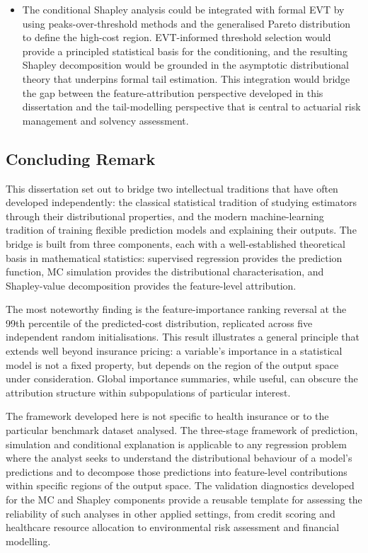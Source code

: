 \begin{itemize}
    \item The conditional Shapley analysis could be integrated with
          formal EVT by using peaks-over-threshold
          methods and the generalised Pareto distribution to define the
          high-cost region.  EVT-informed threshold selection would
          provide a principled statistical basis for the conditioning,
          and the resulting Shapley decomposition would be grounded in
          the asymptotic distributional theory that underpins formal tail
          estimation.  This integration would bridge the gap between
          the feature-attribution perspective developed in this
          dissertation and the tail-modelling perspective that is central
          to actuarial risk management and solvency assessment.
\end{itemize}


\subsection{Concluding Remark}
\label{sec:concluding_remark}

This dissertation set out to bridge two intellectual traditions that have
often developed independently: the classical statistical tradition of
studying estimators through their distributional properties, and the
modern machine-learning tradition of training flexible prediction models
and explaining their outputs.  The bridge is built from three components,
each with a well-established theoretical basis in mathematical statistics:
supervised regression provides the prediction function, MC
simulation provides the distributional characterisation, and Shapley-value
decomposition provides the feature-level attribution.

The most noteworthy finding is the feature-importance ranking reversal at
the 99th percentile of the predicted-cost distribution, replicated
across five independent random initialisations.  This result
illustrates a general principle that extends well
beyond insurance pricing: a variable's importance in a statistical model
is not a fixed property, but depends on the region of the output space
under consideration.  Global importance summaries, while useful, can
obscure the attribution structure within subpopulations of particular
interest.

The framework developed here is not specific to health insurance or to the
particular benchmark dataset analysed.  The three-stage framework of
prediction, simulation and conditional explanation is applicable to any
regression problem where the analyst seeks to understand the distributional
behaviour of a model's predictions and to decompose those predictions into
feature-level contributions within specific regions of the output space.
The validation diagnostics developed for the MC and Shapley
components provide a reusable template for assessing the reliability of
such analyses in other applied settings, from credit scoring and
healthcare resource allocation to environmental risk assessment and
financial modelling.

